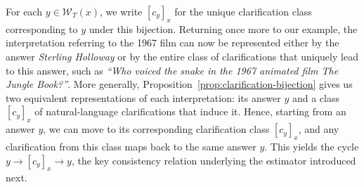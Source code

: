 For each \(y \in \mathcal{W}_T(x)\), we write \([c_y]_x\) for the unique clarification class corresponding to \(y\) under this bijection. Returning once more to our example, the interpretation referring to the 1967 film can now be represented either by the answer \emph{Sterling Holloway} or by the entire class of clarifications that uniquely lead to this answer, such as \emph{``Who voiced the snake in the 1967 animated film The Jungle Book?''}. More generally,
Proposition~\ref{prop:clarification-bijection} gives us two equivalent
representations of each interpretation: its answer \(y\) and a class
\([c_y]_x\) of natural-language clarifications that induce it. Hence, starting from an answer \(y\), we can move to its corresponding clarification class \([c_y]_x\), and any clarification from this class maps back to the same answer \(y\). This yields the cycle \(y \longrightarrow [c_y]_x \longrightarrow y\), the key consistency relation underlying the estimator introduced next.








